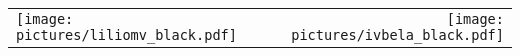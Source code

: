 \begin{center}

\mbox{}
\newpage

    \begin{table}[ht]
        \begin{tabular*}{\textwidth}{@{\extracolsep{\fill}}lcr}
        \texttt{[image: pictures/liliomv\_black.pdf]} &  & \texttt{[image: pictures/ivbela\_black.pdf]}\\
        \end{tabular*}
    \end{table}%

~\\[\baselineskip]
~\\[\baselineskip]

{\Huge \textbf{\cim}}
~\\[\baselineskip]
~\\[\baselineskip]
{\large \cscslong}
~\\[\baselineskip]
~\\[\baselineskip]
\vfill

\end{center}

\newpage

